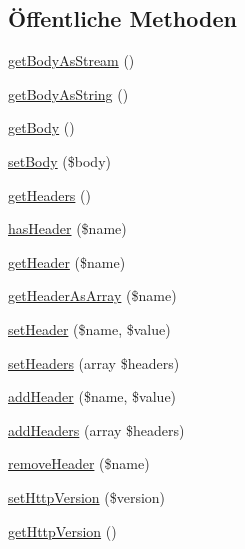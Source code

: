 \subsection*{Öffentliche Methoden}
\begin{DoxyCompactItemize}
\item 
\mbox{\hyperlink{class_sabre_1_1_h_t_t_p_1_1_message_ae4b1d83743287c4e0f6500fbb4ff3c13}{get\+Body\+As\+Stream}} ()
\item 
\mbox{\hyperlink{class_sabre_1_1_h_t_t_p_1_1_message_aa6a73aa5da947ec18adcf254abb4c0ef}{get\+Body\+As\+String}} ()
\item 
\mbox{\hyperlink{class_sabre_1_1_h_t_t_p_1_1_message_adbab038f2bd823f11e4ade75cc792f14}{get\+Body}} ()
\item 
\mbox{\hyperlink{class_sabre_1_1_h_t_t_p_1_1_message_aef29d4593bbe2debd17bfbcd501e5dcd}{set\+Body}} (\$body)
\item 
\mbox{\hyperlink{class_sabre_1_1_h_t_t_p_1_1_message_aba056637d07f07a2cfa23f893f12940d}{get\+Headers}} ()
\item 
\mbox{\hyperlink{class_sabre_1_1_h_t_t_p_1_1_message_abcaf141342d71f887630dac0a6eca95a}{has\+Header}} (\$name)
\item 
\mbox{\hyperlink{class_sabre_1_1_h_t_t_p_1_1_message_aea639d7fd0ca29dadee89eba3f2e3b8d}{get\+Header}} (\$name)
\item 
\mbox{\hyperlink{class_sabre_1_1_h_t_t_p_1_1_message_a15a679683a423df9878d08e208433448}{get\+Header\+As\+Array}} (\$name)
\item 
\mbox{\hyperlink{class_sabre_1_1_h_t_t_p_1_1_message_a81f40ecdcfb4dfad362f800a5be8813c}{set\+Header}} (\$name, \$value)
\item 
\mbox{\hyperlink{class_sabre_1_1_h_t_t_p_1_1_message_abe99bdab90115cca0489dc36037ef872}{set\+Headers}} (array \$headers)
\item 
\mbox{\hyperlink{class_sabre_1_1_h_t_t_p_1_1_message_a0eeb8ea72e67ded5a4c08f940298a321}{add\+Header}} (\$name, \$value)
\item 
\mbox{\hyperlink{class_sabre_1_1_h_t_t_p_1_1_message_a93a5ab3baa93035f13f38c9652cb8ee0}{add\+Headers}} (array \$headers)
\item 
\mbox{\hyperlink{class_sabre_1_1_h_t_t_p_1_1_message_a0a6fae5616cd2131464eb1263e78c5c7}{remove\+Header}} (\$name)
\item 
\mbox{\hyperlink{class_sabre_1_1_h_t_t_p_1_1_message_a92fc3c197a8d7c713c7ccafc61989147}{set\+Http\+Version}} (\$version)
\item 
\mbox{\hyperlink{class_sabre_1_1_h_t_t_p_1_1_message_a690263e84e9503548b5ed73e0518433a}{get\+Http\+Version}} ()
\end{DoxyCompactItemize}
